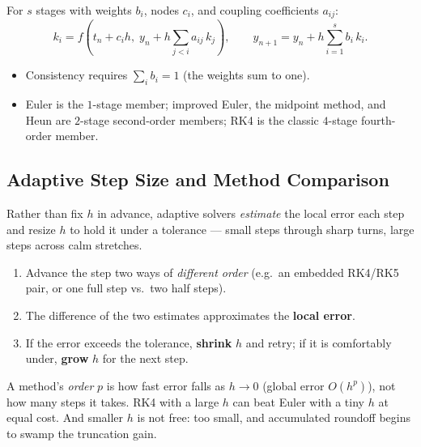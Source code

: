 \begin{formulabox}
For $s$ stages with weights $b_i$, nodes $c_i$, and coupling coefficients
$a_{ij}$:
\[ k_i = f\!\left(t_n + c_i h,\; y_n + h\sum_{j<i} a_{ij}\,k_j\right), \qquad
   y_{n+1} = y_n + h\sum_{i=1}^{s} b_i\,k_i. \]
\begin{itemize}[leftmargin=1.4em, itemsep=2pt]
    \item Consistency requires $\sum_i b_i = 1$ (the weights sum to one).
    \item Euler is the $1$-stage member; improved Euler, the midpoint method, and
          Heun are $2$-stage second-order members; RK4 is the classic $4$-stage
          fourth-order member.
\end{itemize}
\end{formulabox}

\subsection{Adaptive Step Size and Method Comparison}

Rather than fix $h$ in advance, adaptive solvers \emph{estimate} the local error
each step and resize $h$ to hold it under a tolerance --- small steps through
sharp turns, large steps across calm stretches.

\begin{methodbox}
\begin{enumerate}[leftmargin=1.6em, itemsep=2pt]
    \item Advance the step two ways of \emph{different order} (e.g.\ an embedded
          RK4/RK5 pair, or one full step vs.\ two half steps).
    \item The difference of the two estimates approximates the \textbf{local
          error}.
    \item If the error exceeds the tolerance, \textbf{shrink} $h$ and retry; if it
          is comfortably under, \textbf{grow} $h$ for the next step.
\end{enumerate}
\end{methodbox}

\begin{warningbox}
A method's \emph{order} $p$ is how fast error falls as $h\to 0$ (global error
$O(h^{p})$), not how many steps it takes. RK4 with a large $h$ can beat Euler with
a tiny $h$ at equal cost. And smaller $h$ is not free: too small, and accumulated
roundoff begins to swamp the truncation gain.
\end{warningbox}

